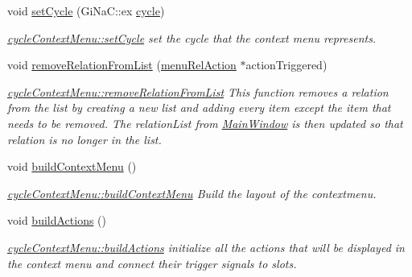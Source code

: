 \begin{DoxyCompactItemize}
void \mbox{\hyperlink{classcycle_context_menu_adf29caf51604118b6ced6a02c5172252}{set\+Cycle}} (Gi\+Na\+C\+::ex \mbox{\hyperlink{class_moeb_inv_1_1cycle}{cycle}})
\begin{DoxyCompactList}\small\item\em \mbox{\hyperlink{classcycle_context_menu_adf29caf51604118b6ced6a02c5172252}{cycle\+Context\+Menu\+::set\+Cycle}} set the cycle that the context menu represents. \end{DoxyCompactList}\item 
void \mbox{\hyperlink{classcycle_context_menu_a83f3eb1ea5338154095a7bf1e2c77b01}{remove\+Relation\+From\+List}} (\mbox{\hyperlink{classmenu_rel_action}{menu\+Rel\+Action}} $\ast$action\+Triggered)
\begin{DoxyCompactList}\small\item\em \mbox{\hyperlink{classcycle_context_menu_a83f3eb1ea5338154095a7bf1e2c77b01}{cycle\+Context\+Menu\+::remove\+Relation\+From\+List}} This function removes a relation from the list by creating a new list and adding every item except the item that needs to be removed. The \textquotesingle{}relation\+List\textquotesingle{} from \mbox{\hyperlink{class_main_window}{Main\+Window}} is then updated so that \textquotesingle{}relation\textquotesingle{} is no longer in the list. \end{DoxyCompactList}\item 
void \mbox{\hyperlink{classcycle_context_menu_a155448ae220555423d26b055f50b6e49}{build\+Context\+Menu}} ()
\begin{DoxyCompactList}\small\item\em \mbox{\hyperlink{classcycle_context_menu_a155448ae220555423d26b055f50b6e49}{cycle\+Context\+Menu\+::build\+Context\+Menu}} Build the layout of the contextmenu. \end{DoxyCompactList}\item 
\mbox{\label{classcycle_context_menu_a2ada1b40956db90398503d184afdd5ee}} 
void \mbox{\hyperlink{classcycle_context_menu_a2ada1b40956db90398503d184afdd5ee}{build\+Actions}} ()
\begin{DoxyCompactList}\small\item\em \mbox{\hyperlink{classcycle_context_menu_a2ada1b40956db90398503d184afdd5ee}{cycle\+Context\+Menu\+::build\+Actions}} initialize all the actions that will be displayed in the context menu and connect their trigger signals to slots. \end{DoxyCompactList}\item 

\end{DoxyCompactItemize}
